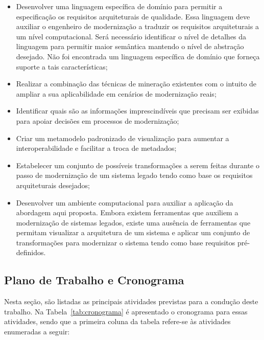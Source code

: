 \documentclass[12pt]{article}
\begin{document}
\begin{itemize}
\item Desenvolver uma linguagem específica de domínio para permitir a especificação os requisitos arquiteturais de qualidade. Essa linguagem deve auxiliar o engenheiro de modernização a traduzir os requisitos arquiteturais a um nível computacional. Será necessário identificar o nível de detalhes da linguagem para permitir maior semântica mantendo o nível de abstração desejado. Não foi encontrada um linguagem específica de domínio que forneça suporte a tais características;
\item Realizar a combinação das técnicas de mineração existentes com o intuito de ampliar a sua aplicabilidade em cenários de modernização reais;
\item Identificar quais são as informações imprescindíveis que precisam ser exibidas para apoiar decisões em processos de modernização;
\item Criar um metamodelo padronizado de visualização para aumentar a interoperabilidade e facilitar a troca de metadados;
\item Estabelecer um conjunto de possíveis transformações a serem feitas durante o passo de modernização de um sistema legado tendo como base os requisitos arquiteturais desejados;
\item Desenvolver um ambiente computacional para auxiliar a aplicação da abordagem aqui proposta. Embora existem ferramentas que auxiliem a modernização de sistemas legados, existe uma ausência de ferramentas que permitam visualizar a arquitetura de um sistema e aplicar um conjunto de transformações para modernizar o sistema tendo como base requisitos pré-definidos.

\end{itemize}

\subsection{Plano de Trabalho e Cronograma}

Nesta seção, são listadas as principais atividades previstas para a condução deste trabalho. Na Tabela~\ref{tab:cronograma} é apresentado o cronograma para essas atividades, sendo que a primeira coluna da tabela refere-se às atividades enumeradas a seguir:
\end{document}
